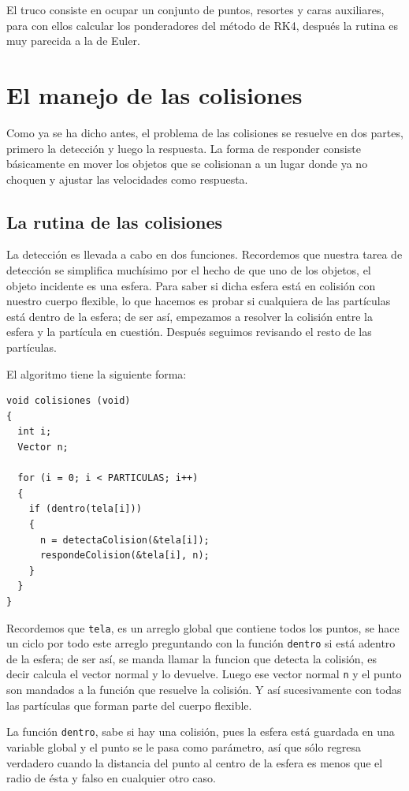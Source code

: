 El truco consiste en ocupar un conjunto de puntos, resortes y caras auxiliares, para con ellos calcular los ponderadores del método de RK4, después la rutina es muy parecida a la de Euler.

\section{El manejo de las colisiones}
Como ya se ha dicho antes, el problema de las colisiones se resuelve en dos partes, primero la detección y luego la respuesta.
La forma de responder consiste básicamente en mover los objetos que se colisionan a un lugar donde ya no choquen y ajustar las velocidades como respuesta.

\subsection{La rutina de las colisiones}
La detección es llevada a cabo en dos funciones.
Recordemos que nuestra tarea de detección se simplifica muchísimo por el hecho de que uno de los objetos, el objeto incidente es una esfera.
Para saber si dicha esfera está en colisión con nuestro cuerpo flexible, lo que hacemos es probar si cualquiera de las partículas está dentro de la esfera; de ser así, empezamos a resolver la colisión entre la esfera y la partícula en cuestión. Después seguimos revisando el resto de las partículas.

El algoritmo tiene la siguiente forma:
\begin{verbatim}
void colisiones (void)
{
  int i;
  Vector n;

  for (i = 0; i < PARTICULAS; i++)
  {
    if (dentro(tela[i]))
    {
      n = detectaColision(&tela[i]);
      respondeColision(&tela[i], n);
    }
  }
}
\end{verbatim}
Recordemos que \verb|tela|, es un arreglo global que contiene todos los puntos, se hace un ciclo por todo este arreglo preguntando con la función \verb|dentro| si está adentro de la esfera; de ser así, se manda llamar la funcion que detecta la colisión, es decir calcula el vector normal y lo devuelve.
Luego ese vector normal \verb|n| y el punto son mandados a la función que resuelve la colisión. Y así sucesivamente con todas las partículas que forman parte del cuerpo flexible.

La función \verb|dentro|, sabe si hay una colisión, pues la esfera está guardada en una variable global y el punto se le pasa como parámetro, así que sólo regresa verdadero cuando la distancia del punto al centro de la esfera es menos que el radio de ésta y falso en cualquier otro caso.

